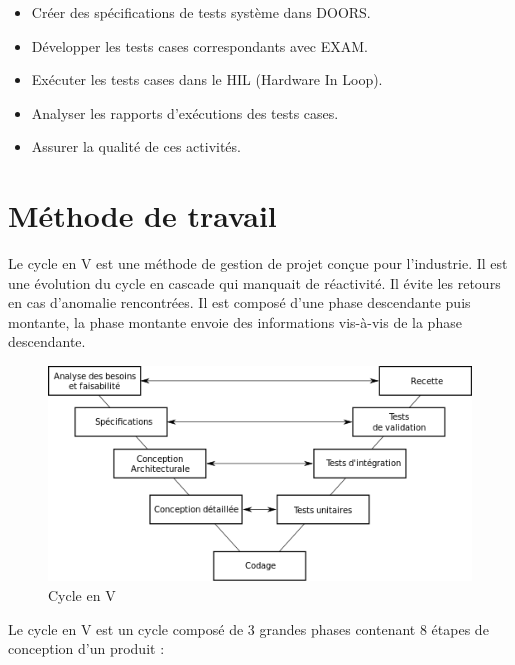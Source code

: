 \begin{itemize}
	\item Créer des spécifications de tests système dans DOORS.
	\item Développer les tests cases correspondants avec EXAM.
	\item Exécuter les tests cases dans le HIL (Hardware In Loop).
	\item Analyser les rapports d’exécutions des tests cases.	
	\item Assurer la qualité de ces activités.
\end{itemize}

\section{Méthode de travail}

Le cycle en V est une méthode de gestion de projet conçue pour l’industrie. Il est une évolution du cycle en cascade qui manquait de réactivité. Il évite les retours en cas d’anomalie rencontrées. Il est composé d’une phase descendante puis montante, la phase montante envoie des informations vis-à-vis de la phase descendante.

\begin{figure}[H]
 \centering
 \includegraphics[scale=0.9]{images/cycle_v}
 \caption{Cycle en V}
\end{figure}

\noindent Le cycle en V est un cycle composé de 3 grandes phases contenant 8 étapes de conception d’un produit : 

